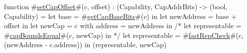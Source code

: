 function #\hyperref[sailRISCVzsetCapOffset]{setCapOffset}#(c, offset) : (Capability, CapAddrBits) -> (bool, Capability) =
    let base = #\hyperref[sailRISCVzgetCapBaseBits]{getCapBaseBits}#(c) in
    let newAddress = base + offset in
    let newCap     = { c with address = newAddress } in
    /* let representable = #\hyperref[sailRISCVzcapBoundsEqual]{capBoundsEqual}#(c, newCap) in */
    let representable = #\hyperref[sailRISCVzfastRepCheck]{fastRepCheck}#(c, (newAddress - c.address)) in
    (representable, newCap)
